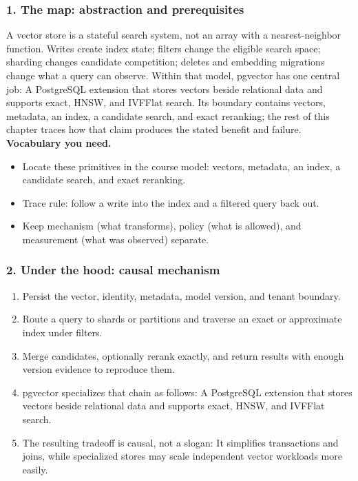 \subsubsection*{1. The map: abstraction and prerequisites}
A vector store is a stateful search system, not an array with a nearest-neighbor function. Writes create index state; filters change the eligible search space; sharding changes candidate competition; deletes and embedding migrations change what a query can observe.
Within that model, pgvector has one central job: A PostgreSQL extension that stores vectors beside relational data and supports exact, HNSW, and IVFFlat search. Its boundary contains vectors, metadata, an index, a candidate search, and exact reranking; the rest of this chapter traces how that claim produces the stated benefit and failure.
\textbf{Vocabulary you need.}\begin{itemize}
\item Locate these primitives in the course model: vectors, metadata, an index, a candidate search, and exact reranking.
\item Trace rule: follow a write into the index and a filtered query back out.
\item Keep mechanism (what transforms), policy (what is allowed), and measurement (what was observed) separate.
\end{itemize}
\subsubsection*{2. Under the hood: causal mechanism}\begin{enumerate}
\item Persist the vector, identity, metadata, model version, and tenant boundary.
\item Route a query to shards or partitions and traverse an exact or approximate index under filters.
\item Merge candidates, optionally rerank exactly, and return results with enough version evidence to reproduce them.
\item pgvector specializes that chain as follows: A PostgreSQL extension that stores vectors beside relational data and supports exact, HNSW, and IVFFlat search.
\item The resulting tradeoff is causal, not a slogan: It simplifies transactions and joins, while specialized stores may scale independent vector workloads more easily.
\end{enumerate}
